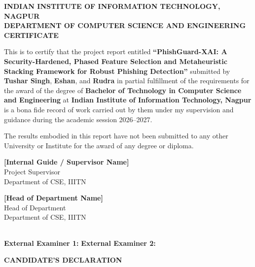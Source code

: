 \documentclass[12pt,a4paper,oneside]{report}
\begin{document}
\newpage
\thispagestyle{plain}
\begin{center}
    {\Large \textbf{INDIAN INSTITUTE OF INFORMATION TECHNOLOGY, NAGPUR}}\\[0.2cm]
    {\large \textbf{DEPARTMENT OF COMPUTER SCIENCE AND ENGINEERING}}\\[1.0cm]
    {\LARGE \textbf{CERTIFICATE}}\\[1.0cm]
\end{center}

This is to certify that the project report entitled \textbf{``PhishGuard-XAI: A Security-Hardened, Phased Feature Selection and Metaheuristic Stacking Framework for Robust Phishing Detection''} submitted by \textbf{Tushar Singh}, \textbf{Eshan}, and \textbf{Rudra} in partial fulfillment of the requirements for the award of the degree of \textbf{Bachelor of Technology in Computer Science and Engineering} at \textbf{Indian Institute of Information Technology, Nagpur} is a bona fide record of work carried out by them under my supervision and guidance during the academic session 2026--2027.

The results embodied in this report have not been submitted to any other University or Institute for the award of any degree or diploma.\\[2.0cm]

\noindent
\begin{minipage}{0.45\textwidth}
    \textbf{[Internal Guide / Supervisor Name]}\\
    Project Supervisor\\
    Department of CSE, IIITN
\end{minipage}
\hfill
\begin{minipage}{0.45\textwidth}
    \begin{flushright}
        \textbf{[Head of Department Name]}\\
        Head of Department\\
        Department of CSE, IIITN
    \end{flushright}
\end{minipage}\\[2.0cm]

\noindent
\textbf{External Examiner 1:} \underline{\hspace{4.5cm}} \hfill \textbf{External Examiner 2:} \underline{\hspace{4.5cm}}

\newpage
\thispagestyle{plain}
\begin{center}
    {\LARGE \textbf{CANDIDATE'S DECLARATION}}\\[1.0cm]
\end{center}
\end{document}
